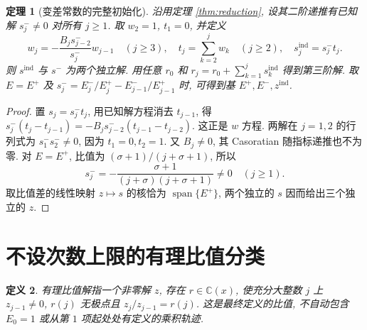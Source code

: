 \documentclass[UTF8]{ctexart}
\newtheorem{theorem}{定理}[section]
\newtheorem{definition}[theorem]{定义}
\newcommand{\sig}{\sigma}
\begin{document}
\begin{theorem}[变差常数的完整初始化]\label{thm:minimal}
 沿用定理 \ref{thm:reduction}, 设其二阶递推有已知解
 $s_j^-\ne0$ 对所有 $j\ge1$. 取 $w_2=1$, $t_1=0$, 并定义
\[
 w_j=-\frac{B_js_{j-2}^-}{s_j^-}w_{j-1}\quad(j\ge3),\quad
 t_j=\sum_{k=2}^jw_k\quad(j\ge2),\quad s_j^{\mathrm{ind}}=s_j^-t_j.
\]
 则 $s^{\mathrm{ind}}$ 与 $s^-$ 为两个独立解. 用任意 $r_0$ 和
 $r_j=r_0+\sum_{k=1}^js_k^{\mathrm{ind}}$ 得到第三阶解.
 取 $E=E^+$ 及 $s_j^-=E_j^-/E_j^+-E_{j-1}^-/E_{j-1}^+$ 时,
 可得到基 $E^+,E^-,z^{\mathrm{ind}}$.
\end{theorem}
\begin{proof}
 置 $s_j=s_j^-t_j$, 用已知解方程消去 $t_{j-1}$, 得
 $s_j^-(t_j-t_{j-1})=-B_js_{j-2}^-(t_{j-1}-t_{j-2})$.
 这正是 $w$ 方程. 两解在 $j=1,2$ 的行列式为
 $s_1^-s_2^-\ne0$, 因为 $t_1=0,t_2=1$.
 又 $B_j\ne0$, 其 Casoratian 随指标递推也不为零.
 对 $E=E^+$, 比值为 $(\sig+1)/(j+\sig+1)$, 所以
\[
 s_j^-=-\frac{\sig+1}{(j+\sig)(j+\sig+1)}\ne0\quad(j\ge1).
\]
 取比值差的线性映射 $z\mapsto s$ 的核恰为 $\operatorname{span}\{E^+\}$,
 两个独立的 $s$ 因而给出三个独立的 $z$.
\end{proof}

\section{不设次数上限的有理比值分类}

\begin{definition}
 有理比值解指一个非零解 $z$, 存在 $r\in\mathbb C(x)$,
 使充分大整数 $j$ 上 $z_{j-1}\ne0$, $r(j)$ 无极点且
 $z_j/z_{j-1}=r(j)$. 这是最终定义的比值, 不自动包含 $E_0=1$
 或从第 $1$ 项起处处有定义的乘积轨迹.
\end{definition}
\end{document}
